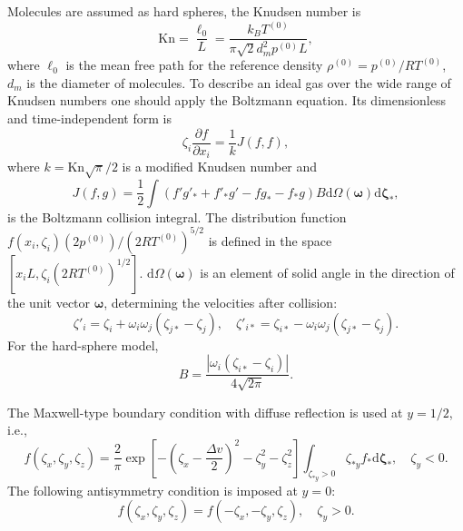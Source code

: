 \documentclass[review]{elsarticle}
\newcommand{\Kn}{\mathrm{Kn}}
\newcommand{\dd}{\mathrm{d}}
\newcommand{\pder}[2][]{\frac{\partial#1}{\partial#2}}
\newcommand{\dzeta}{\boldsymbol{\dd\zeta}}
\begin{document}
Molecules are assumed as hard spheres, the Knudsen number is
\begin{equation}\label{eq:Kn_number}
    \Kn = \frac{\ell_0}{L} = \frac{k_BT^{(0)}}{\pi\sqrt{2} d_m^2p^{(0)}L},
\end{equation}
where \(\ell_0\) is the mean free path for the reference density \(\rho^{(0)} = p^{(0)}/R T^{(0)}\),
\(d_m\) is the diameter of molecules.
To describe an ideal gas over the wide range of Knudsen numbers
one should apply the Boltzmann equation.
Its dimensionless and time-independent form is
\begin{equation}\label{eq:Boltzmann}
    \zeta_i\pder[f]{x_i} = \frac1k J(f,f),
\end{equation}
where \(k = \Kn\sqrt{\pi}/2\) is a modified Knudsen number and
\begin{equation}\label{eq:ci}
    J(f,g) = \frac12 \int (f'g'_* + f'_*g' - fg_* - f_*g) B
    \dd \Omega(\boldsymbol{\omega}) \dzeta_*,
\end{equation}
is the Boltzmann collision integral.
The distribution function \(f(x_i,\zeta_i)(2p^{(0)})/(2RT^{(0)})^{5/2}\) is defined
in the space \([x_iL, \zeta_i(2RT^{(0)})^{1/2}]\).
\(\dd \Omega(\boldsymbol{\omega})\) is an element of solid angle in the direction of the unit vector \(\boldsymbol{\omega}\),
determining the velocities after collision:
\begin{equation}\label{eq:after_collision}
    \zeta'_i = \zeta_i + \omega_i\omega_j(\zeta_{j*}-\zeta_j), \quad
    \zeta'_{i*} = \zeta_{i*} - \omega_i\omega_j(\zeta_{j*}-\zeta_j).
\end{equation}
For the hard-sphere model,
\begin{equation}\label{eq:ci_kernel}
    B = \frac{|\omega_i(\zeta_{i*}-\zeta_i)|}{4\sqrt{2\pi}}.
\end{equation}

The Maxwell-type boundary condition with diffuse reflection is used at \(y=1/2\), i.e.,
\begin{equation}\label{eq:diffuse_bc}
    f(\zeta_x,\zeta_y,\zeta_z) = \frac2{\pi} \exp\left[-\left(\zeta_x-\frac{\Delta{v}}{2}\right)^2-\zeta_y^2-\zeta_z^2\right]
        \int_{\zeta_{*y}>0}\zeta_{*y} f_* \dzeta_*, \quad \zeta_y<0.
\end{equation}
The following antisymmetry condition is imposed at \(y=0\):
\begin{equation}\label{eq:specular_bc}
    f(\zeta_x,\zeta_y,\zeta_z) = f(-\zeta_x,-\zeta_y,\zeta_z), \quad \zeta_y>0.
\end{equation}
\end{document}
